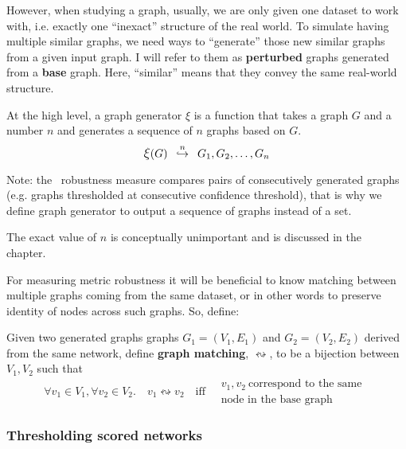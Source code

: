 However, when studying a graph, usually, we are only given one dataset to work with, i.e. exactly one ``inexact'' structure of the real world.
To simulate having multiple similar graphs, we need ways to ``generate'' those new similar graphs from a given input graph.
I will refer to them as \textbf{perturbed} graphs generated from a \textbf{base} graph.
Here, ``similar'' means that they convey the same real-world structure.

At the high level, a graph generator $\xi$ is a function that takes a graph $G$ and a number $n$ and generates a sequence of $n$ graphs based on $G$.
\begin{equation}
    \mathlarger{\xi}(G) \generates{n} G_1, G_2, \dots, G_n
\end{equation}

Note: the~ robustness measure compares pairs of consecutively generated graphs (e.g. graphs thresholded at consecutive confidence threshold), that is why we define graph generator to output a sequence of graphs instead of a set.

The exact value of $n$ is conceptually unimportant and is discussed in the~ chapter.

\parspace

For measuring metric robustness it will be beneficial to know matching between multiple graphs coming from the same dataset, or in other words to preserve identity of nodes across such graphs.
So, define:

\begin{definition}\label{def:graph_matching}
    Given two generated graphs graphs $G_1 = (V_1, E_1)$ and $G_2 = (V_2, E_2)$ derived from the same network, define \textbf{graph matching}, $\leftrightsquigarrow$, to be a bijection between $V_1, V_2$ such that
    \begin{equation}
        \forall v_1 \in V_1, \forall v_2 \in V_2.\quad v_1 \leftrightsquigarrow v_2\quad\text{iff}\quad \begin{array}{l}v_1, v_2\ \text{correspond to the same }\\\text{node in the base graph}\end{array}
    \end{equation}
\end{definition}

\subsubsection{Thresholding scored networks}

